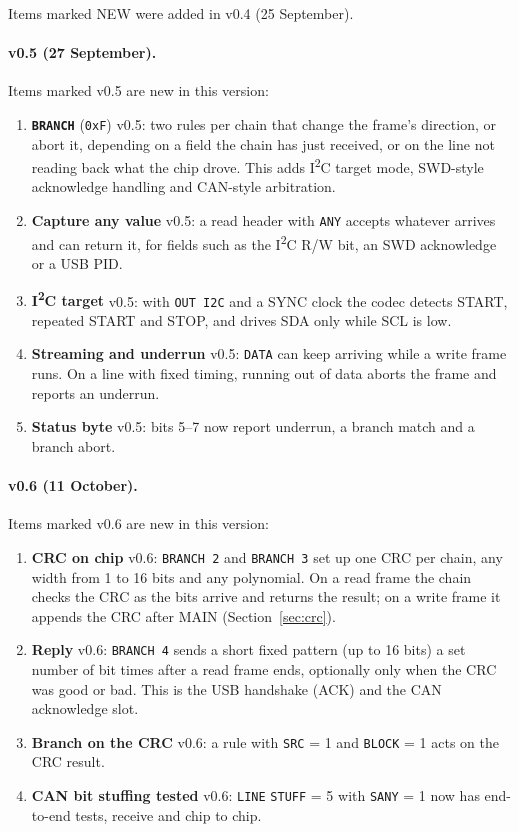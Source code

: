 \documentclass[11pt,a4paper]{article}
\newcommand{\new}{\textcolor{newc}{\textsf{\small NEW}}}
\newcommand{\vfive}{\textcolor{fivec}{\textsf{\small v0.5}}}
\newcommand{\vsix}{\textcolor{sixc}{\textsf{\small v0.6}}}
\newcommand{\sig}[1]{\texttt{#1}}
\begin{document}
Items marked \new{} were added in v0.4 (25 September).

\paragraph{v0.5 (27 September).} Items marked \vfive{} are new in this version:
\begin{enumerate}
\item \textbf{\sig{BRANCH}} (\texttt{0xF}) \vfive: two rules per chain that change the frame's direction, or abort it, depending on a field the chain has just received, or on the line not reading back what the chip drove. This adds I\textsuperscript{2}C target mode, SWD-style acknowledge handling and CAN-style arbitration.
\item \textbf{Capture any value} \vfive: a read header with \sig{ANY} accepts whatever arrives and can return it, for fields such as the I\textsuperscript{2}C R/W bit, an SWD acknowledge or a USB PID.
\item \textbf{I\textsuperscript{2}C target} \vfive: with \sig{OUT I2C} and a SYNC clock the codec detects START, repeated START and STOP, and drives SDA only while SCL is low.
\item \textbf{Streaming and underrun} \vfive: \sig{DATA} can keep arriving while a write frame runs. On a line with fixed timing, running out of data aborts the frame and reports an underrun.
\item \textbf{Status byte} \vfive: bits 5--7 now report underrun, a branch match and a branch abort.
\end{enumerate}

\paragraph{v0.6 (11 October).} Items marked \vsix{} are new in this version:
\begin{enumerate}
\item \textbf{CRC on chip} \vsix: \sig{BRANCH 2} and \sig{BRANCH 3} set up one CRC per chain, any width from 1 to 16 bits and any polynomial. On a read frame the chain checks the CRC as the bits arrive and returns the result; on a write frame it appends the CRC after MAIN (Section~\ref{sec:crc}).
\item \textbf{Reply} \vsix: \sig{BRANCH 4} sends a short fixed pattern (up to 16 bits) a set number of bit times after a read frame ends, optionally only when the CRC was good or bad. This is the USB handshake (ACK) and the CAN acknowledge slot.
\item \textbf{Branch on the CRC} \vsix: a rule with \sig{SRC} = 1 and \sig{BLOCK} = 1 acts on the CRC result.
\item \textbf{CAN bit stuffing tested} \vsix: \sig{LINE} \sig{STUFF} = 5 with \sig{SANY} = 1 now has end-to-end tests, receive and chip to chip.
\end{enumerate}
\end{document}
